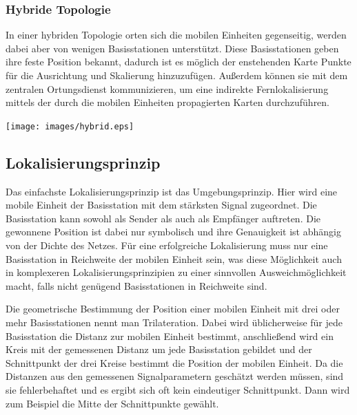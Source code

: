 \subsubsection{Hybride Topologie}
	\begin{minipage}{\textwidth}
		\begin{minipage}[c][6cm][t]{0.6\textwidth\relax}
			In einer hybriden Topologie orten sich die mobilen Einheiten gegenseitig, werden dabei aber von wenigen Basisstationen unterstützt.
			Diese Basisstationen geben ihre feste Position bekannt, dadurch ist es möglich der enstehenden Karte Punkte für die Ausrichtung und Skalierung hinzuzufügen.
			Außerdem können sie mit dem zentralen Ortungsdienst kommunizieren, um eine indirekte Fernlokalisierung mittels der durch die mobilen Einheiten propagierten Karten durchzuführen.
		\end{minipage}\hfill
		\begin{minipage}[c][6cm][c]{0.4\textwidth\relax}
			\centering
			\texttt{[image: images/hybrid.eps]} 
		\end{minipage}
	\end{minipage}


\subsection{Lokalisierungsprinzip}
Das einfachste Lokalisierungsprinzip ist das Umgebungsprinzip. 
Hier wird eine mobile Einheit der Basisstation mit dem stärksten Signal zugeordnet. 
Die Basisstation kann sowohl als Sender als auch als Empfänger auftreten. 
Die gewonnene Position ist dabei nur symbolisch und ihre Genauigkeit ist abhängig von der Dichte des Netzes. 
Für eine erfolgreiche Lokalisierung muss nur eine Basisstation in Reichweite der mobilen Einheit sein, was diese Möglichkeit auch in komplexeren Lokalisierungsprinzipien zu einer sinnvollen Ausweichmöglichkeit macht, falls nicht genügend Basisstationen in Reichweite sind. 

Die geometrische Bestimmung der Position einer mobilen Einheit mit drei oder mehr Basisstationen nennt man Trilateration. Dabei wird üblicherweise für jede Basisstation die Distanz zur mobilen Einheit bestimmt, anschließend wird ein Kreis mit der gemessenen Distanz um jede Basisstation gebildet und der Schnittpunkt der drei Kreise bestimmt die Position der mobilen Einheit. Da die Distanzen aus den gemessenen Signalparametern geschätzt werden müssen, sind sie fehlerbehaftet und es ergibt sich oft kein eindeutiger Schnittpunkt. 
Dann wird zum Beispiel die Mitte der Schnittpunkte gewählt. 

